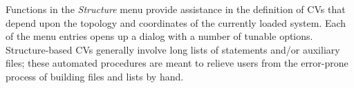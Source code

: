 \documentclass[preprint,12pt]{elsarticle}
\begin{document}

Functions in the \emph{Structure} menu provide assistance in the
definition of CVs that depend upon the topology and coordinates of
the currently loaded system.  Each of the menu entries opens up a
dialog with a number of tunable options. Structure-based CVs
generally involve long lists of statements and/or auxiliary files;
these automated procedures are meant to relieve users from the error-prone
process of building files and lists by hand.



\begin{figure}
  \centering

\end{figure}
\end{document}
